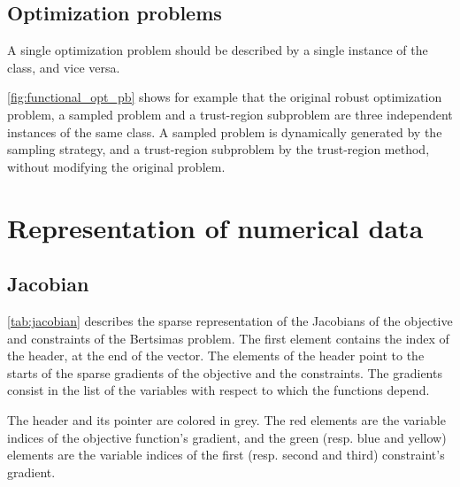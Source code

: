 \documentclass[11pt,twoside]{book}
\begin{document}
\section{Optimization problems}

A single optimization problem should be described by a single instance
of the class, and vice versa.

\autoref{fig:functional_opt_pb} shows for example that the original
robust optimization problem, a sampled problem and a trust-region
subproblem are three independent instances of the same class. A sampled
problem is dynamically generated by the sampling strategy, and a
trust-region subproblem by the trust-region method, without modifying
the original problem.

%

\chapter{Representation of numerical data}

\section{Jacobian}

\autoref{tab:jacobian} describes the sparse representation of the Jacobians of the objective and constraints of the
Bertsimas problem. The first element contains the index of the header, at the end of the vector. The elements of the
header point to the starts of the sparse gradients of the objective and the constraints. The gradients consist in the
list of the variables with respect to which the functions depend.

The header and its pointer are colored in grey. The red elements are the variable indices of the objective function's
gradient, and the green (resp. blue and yellow) elements are the variable indices of the first (resp. second and third)
constraint's gradient.
\end{document}
